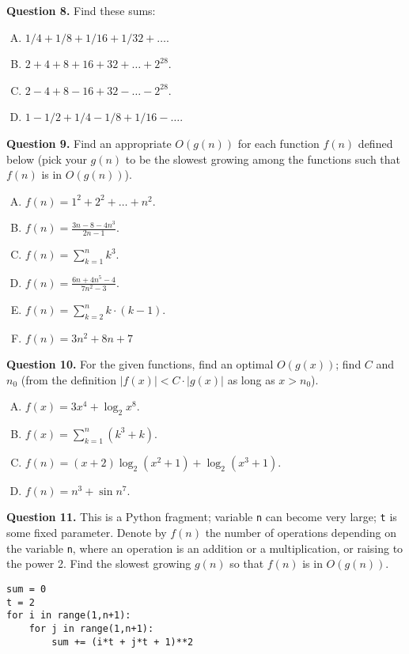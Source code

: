 \documentclass[jou]{apa6}
\begin{document}
\vspace{6pt}
{\bf Question 8.} Find these sums:
\begin{enumerate}[(A)]
\item $1/4 + 1/8 + 1/16 + 1/32 + \ldots$.
\item $2 + 4 + 8 + 16 + 32 + \ldots + 2^{28}$.
\item $2 - 4 + 8 - 16 + 32 - \ldots - 2^{28}$.
\item $1 - 1/2 + 1/4 - 1/8 + 1/16 - \ldots$.
\end{enumerate}

\vspace{6pt}
{\bf Question 9.} Find an appropriate $O(g(n))$ for each function $f(n)$ defined below 
(pick your $g(n)$ to be the slowest growing among the functions such that $f(n)$ is in $O(g(n))$). 
\begin{enumerate}[(A)]
\item $f(n) = 1^2 + 2^2 + \ldots + n^2$.
\item ${\displaystyle f(n) = \frac{3n - 8 - 4n^3}{2n - 1}}$. 
\item ${\displaystyle f(n) = \sum\limits_{k=1}^{n} k^3}$.
\item ${\displaystyle f(n) = \frac{6n + 4n^5 - 4}{7n^2 - 3}}$. 
\item ${\displaystyle f(n) = \sum\limits_{k=2}^{n} k\cdot(k-1)}$.
\item ${\displaystyle f(n) = 3n^2 + 8n + 7}$
\end{enumerate}

\vspace{6pt}
{\bf Question 10.}
For the given functions, find an optimal $O(g(x))$; find
$C$ and $n_0$ (from the definition $|f(x)| < C\cdot |g(x)|$ as long as $x > n_0$). 
\begin{enumerate}[(A)]
\item ${\displaystyle f(x) = 3x^4 + \log_2 x^8}$. 
\item ${\displaystyle f(x) = \sum\limits_{k=1}^{n} (k^3 + k)}$.
\item ${\displaystyle f(n) = (x + 2)\log_2 (x^2 + 1) + \log_2 (x^3 + 1)}$.
\item ${\displaystyle f(n) = n^3 + \sin n^7}$.
\end{enumerate}


\vspace{6pt}
{\bf Question 11.} This is a Python fragment; variable {\tt n} can become very large; {\tt t} is some
fixed parameter. Denote by $f(n)$ the number of operations depending on the variable {\tt n}, 
where an operation is an addition or a multiplication, or raising to the power 2.
Find the slowest growing $g(n)$ so that $f(n)$ is in $O(g(n))$. 
\begin{verbatim}
sum = 0
t = 2
for i in range(1,n+1):
    for j in range(1,n+1):
        sum += (i*t + j*t + 1)**2
\end{verbatim}
\end{document}
